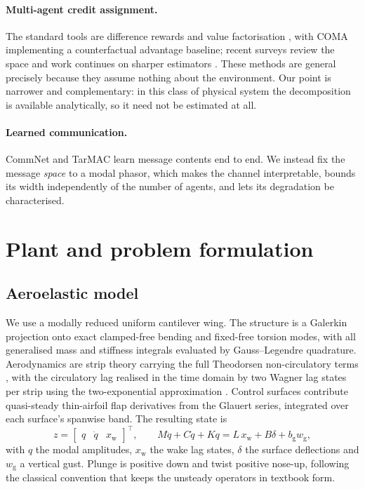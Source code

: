\documentclass[11pt,a4paper]{article}
\begin{document}
\paragraph{Multi-agent credit assignment.}
The standard tools are difference rewards \cite{wolpert2002difference} and value
factorisation \cite{sunehag2018vdn,rashid2018qmix}, with COMA
\cite{foerster2018coma} implementing a counterfactual advantage baseline; recent
surveys review the space \cite{albrecht2023survey,scalingmarl2025} and work
continues on sharper estimators \cite{multilevelcredit2025}. These methods are
general precisely because they assume nothing about the environment. Our point is
narrower and complementary: in this class of physical system the decomposition is
available analytically, so it need not be estimated at all.

\paragraph{Learned communication.}
CommNet \cite{sukhbaatar2016commnet} and TarMAC \cite{das2019tarmac} learn
message contents end to end. We instead fix the message \emph{space} to a modal
phasor, which makes the channel interpretable, bounds its width independently of
the number of agents, and lets its degradation be characterised.

\section{Plant and problem formulation}

\subsection{Aeroelastic model}

We use a modally reduced uniform cantilever wing. The structure is a Galerkin
projection onto exact clamped-free bending and fixed-free torsion modes, with all
generalised mass and stiffness integrals evaluated by Gauss--Legendre quadrature.
Aerodynamics are strip theory carrying the full Theodorsen non-circulatory terms
\cite{theodorsen1935}, with the circulatory lag realised in the time domain by two
Wagner lag states per strip using the two-exponential approximation
\cite{jones1940}. Control surfaces contribute quasi-steady thin-airfoil flap
derivatives from the Glauert series, integrated over each surface's spanwise band.
The resulting state is
\begin{equation}
z = \begin{bmatrix} q & \dot q & x_{\mathrm{w}} \end{bmatrix}^{\!\top},
\qquad
M \ddot q + C \dot q + K q = L\, x_{\mathrm{w}} + B \delta + b_{\mathrm{g}} w_{\mathrm{g}},
\label{eq:eom}
\end{equation}
with $q$ the modal amplitudes, $x_{\mathrm{w}}$ the wake lag states, $\delta$ the
surface deflections and $w_{\mathrm{g}}$ a vertical gust. Plunge is positive down
and twist positive nose-up, following the classical convention
\cite{fung1955,bisplinghoff1955} that keeps the unsteady operators in textbook
form.
\end{document}
